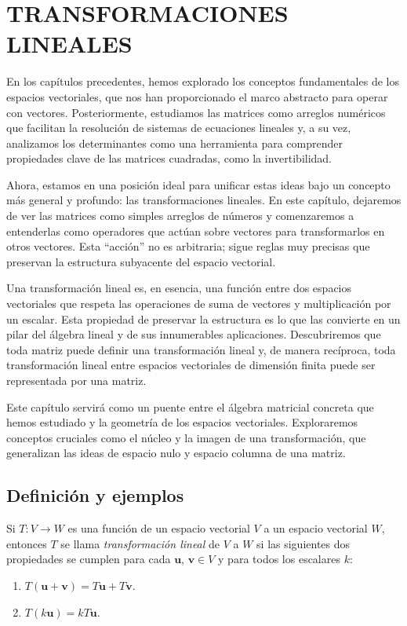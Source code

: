 \chapter[TRANSFORMACIONES LINEALES]{TRANSFORMACIONES \\ LINEALES}

En los capítulos precedentes, hemos explorado los conceptos fundamentales de los espacios vectoriales, que nos han proporcionado el marco abstracto para operar con vectores. Posteriormente, estudiamos las matrices como arreglos numéricos que facilitan la resolución de sistemas de ecuaciones lineales y, a su vez, analizamos los determinantes como una herramienta para comprender propiedades clave de las matrices cuadradas, como la invertibilidad.

Ahora, estamos en una posición ideal para unificar estas ideas bajo un concepto más general y profundo: las transformaciones lineales. En este capítulo, dejaremos de ver las matrices como simples arreglos de números y comenzaremos a entenderlas como operadores que actúan sobre vectores para transformarlos en otros vectores. Esta “acción” no es arbitraria; sigue reglas muy precisas que preservan la estructura subyacente del espacio vectorial.

Una transformación lineal es, en esencia, una función entre dos espacios vectoriales que respeta las operaciones de suma de vectores y multiplicación por un escalar. Esta propiedad de preservar la estructura es lo que las convierte en un pilar del álgebra lineal y de sus innumerables aplicaciones. Descubriremos que toda matriz puede definir una transformación lineal y, de manera recíproca, toda transformación lineal entre espacios vectoriales de dimensión finita puede ser representada por una matriz.

Este capítulo servirá como un puente entre el álgebra matricial concreta que hemos estudiado y la geometría de los espacios vectoriales. Exploraremos conceptos cruciales como el núcleo y la imagen de una transformación, que generalizan las ideas de espacio nulo y espacio columna de una matriz. 

\newpage

\section{Definición y ejemplos}

\begin{definicion}{}{}
    Si $T: V \longrightarrow W$ es una función de un espacio vectorial $V$ a un espacio vectorial $W$, entonces $T$ se llama \emph{transformación lineal} de $V$ a $W$ si las siguientes dos propiedades se cumplen para cada $\mathbf{u}$, $\mathbf{v} \in V$ y para todos los escalares $k$:
    \begin{enumerate}[label=\roman*), topsep=6pt, itemsep=0pt]
        \item $T(\mathbf{u} + \mathbf{v}) = T\mathbf{u} + T\mathbf{v}$.
        \item $T(k\mathbf{u}) = kT\mathbf{u}$.
    \end{enumerate}
\end{definicion}

